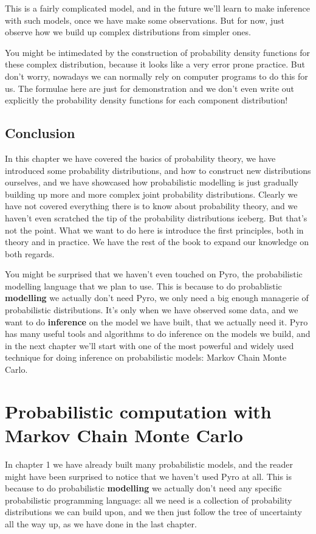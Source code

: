 \documentclass[11pt]{article}
\begin{document}
This is a fairly complicated model, and in the future we'll learn to make inference with such models, once we have make some observations. But for now, just observe how we build up complex distributions from simpler ones.

You might be intimedated by the construction of probability density functions for these complex distribution, because it looks like a very error prone practice. But don't worry, nowadays we can normally rely on computer programs to do this for us. The formulae here are just for demonstration and we don't even write out explicitly the probability density functions for each component distribution!

\subsection{Conclusion}
\label{sec:org39bd8c5}

In this chapter we have covered the basics of probability theory, we have introduced some probability distributions, and how to construct new distributions ourselves, and we have showcased how probabilistic modelling is just gradually building up more and more complex joint probability distributions. Clearly we have not covered everything there is to know about probability theory, and we haven't even scratched the tip of the probability distributions iceberg. But that's not the point. What we want to do here is introduce the first principles, both in theory and in practice. We have the rest of the book to expand our knowledge on both regards.

You might be surprised that we haven't even touched on Pyro, the probabilistic modelling language that we plan to use. This is because to do probablistic \textbf{modelling} we actually don't need Pyro, we only need a big enough managerie of probabilistic distributions. It's only when we have observed some data, and we want to do \textbf{inference} on the model we have built, that we actually need it. Pyro has many useful tools and algorithms to do inference on the models we build, and in the next chapter we'll start with one of the most powerful and widely used technique for doing inference on probabilistic models: Markov Chain Monte Carlo.

\section{Probabilistic computation with Markov Chain Monte Carlo}
\label{mcmc}
In chapter 1 we have already built many probabilistic models, and the reader might have been surprised to notice that we haven't used Pyro at all. This is because to do probabilistic \textbf{modelling} we actually don't need any specific probabilistic programming language: all we need is a collection of probability distributions we can build upon, and we then just follow the tree of uncertainty all the way up, as we have done in the last chapter.
\end{document}
